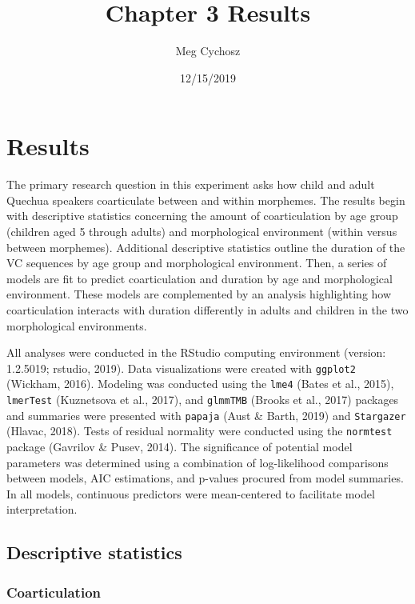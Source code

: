 \documentclass[
]{article}
\title{Chapter 3 Results}
\author{Meg Cychosz}
\date{12/15/2019}
\begin{document}
\maketitle

{
\setcounter{tocdepth}{2}
\tableofcontents
}
\hypertarget{results}{%
\section{Results}\label{results}}

The primary research question in this experiment asks how child and adult Quechua speakers coarticulate between and within morphemes. The results begin with descriptive statistics concerning the amount of coarticulation by age group (children aged 5 through adults) and morphological environment (within versus between morphemes). Additional descriptive statistics outline the duration of the VC sequences by age group and morphological environment. Then, a series of models are fit to predict coarticulation and duration by age and morphological environment. These models are complemented by an analysis highlighting how coarticulation interacts with duration differently in adults and children in the two morphological environments.

All analyses were conducted in the RStudio computing environment (version: 1.2.5019; rstudio, 2019). Data visualizations were created with \texttt{ggplot2} (Wickham, 2016). Modeling was conducted using the \texttt{lme4} (Bates et al., 2015), \texttt{lmerTest} (Kuznetsova et al., 2017), and \texttt{glmmTMB} (Brooks et al., 2017) packages and summaries were presented with \texttt{papaja} (Aust \& Barth, 2019) and \texttt{Stargazer} (Hlavac, 2018). Tests of residual normality were conducted using the \texttt{normtest} package (Gavrilov \& Pusev, 2014). The significance of potential model parameters was determined using a combination of log-likelihood comparisons between models, AIC estimations, and p-values procured from model summaries. In all models, continuous predictors were mean-centered to facilitate model interpretation.

\hypertarget{descriptive-statistics}{%
\subsection{Descriptive statistics}\label{descriptive-statistics}}

\hypertarget{coarticulation}{%
\subsubsection{Coarticulation}\label{coarticulation}}
\end{document}
